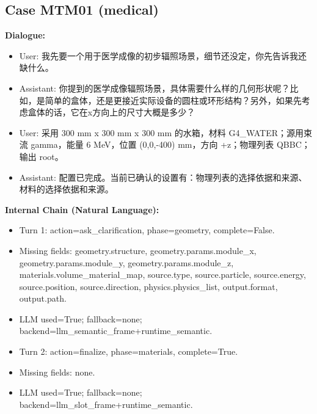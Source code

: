 \documentclass[11pt]{ctexart}
\begin{document}
\subsection{Case MTM01 (medical)}
\textbf{Dialogue:}
\begin{itemize}
\item User: 我先要一个用于医学成像的初步辐照场景，细节还没定，你先告诉我还缺什么。
\item Assistant: 你提到的医学成像辐照场景，具体需要什么样的几何形状呢？比如，是简单的盒体，还是更接近实际设备的圆柱或环形结构？另外，如果先考虑盒体的话，它在x方向上的尺寸大概是多少？
\item User: 采用 300 mm x 300 mm x 300 mm 的水箱，材料 G4\_WATER；源用束流 gamma，能量 6 MeV，位置 (0,0,-400) mm，方向 +z；物理列表 QBBC；输出 root。
\item Assistant: 配置已完成。当前已确认的设置有：物理列表的选择依据和来源、材料的选择依据和来源。
\end{itemize}
\textbf{Internal Chain (Natural Language):}
\begin{itemize}
\item Turn 1: action=ask\_clarification, phase=geometry, complete=False.
\item Missing fields: geometry.structure, geometry.params.module\_x, geometry.params.module\_y, geometry.params.module\_z, materials.volume\_material\_map, source.type, source.particle, source.energy, source.position, source.direction, physics.physics\_list, output.format, output.path.
\item LLM used=True; fallback=none; backend=llm\_semantic\_frame+runtime\_semantic.
\item Turn 2: action=finalize, phase=materials, complete=True.
\item Missing fields: none.
\item LLM used=True; fallback=none; backend=llm\_slot\_frame+runtime\_semantic.
\end{itemize}
\end{document}
